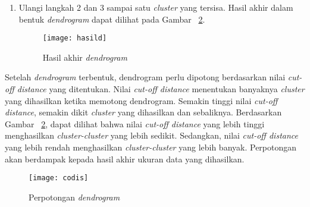 \begin{enumerate}
\begin{align} 
d(A,C) & = \sqrt{(2 - 2)^2+(4 - 6)^2} \\
& = 4.47 
\end{align}
\begin{align} 
d(B,C) & = \sqrt{(2 - 3)^2+(4 - 6)^2} \\
& = 3.61 
\end{align}\\


Karena nilai 3.61 lebih kecil dari 4.47, maka nilai 3.61 diambil sebagai hasil. Contoh hasil dapat dilihat pada Gambar ~\ref{fig:step3}. 

\begin{figure}[H]
    \centering  
    \texttt{[image: step3]}  
    \caption[Hasil rekalkulasi]{Hasil rekalkulasi} 
    \label{fig:step3} 
\end{figure}

\item Ulangi langkah 2 dan 3 sampai satu \textit{cluster} yang tersisa. Hasil akhir dalam bentuk \textit{dendrogram} dapat dilihat pada Gambar ~\ref{fig:hasild}.

\begin{figure}[H]
    \centering  
    \texttt{[image: hasild]}  
    \caption[Hasil akhir \textit{dendrogram} ]{Hasil akhir \textit{dendrogram}} 
    \label{fig:hasild} 
\end{figure}

\end{enumerate}

Setelah \textit{dendrogram} terbentuk, dendrogram perlu dipotong berdasarkan nilai \textit{cut-off distance} yang ditentukan. Nilai \textit{cut-off distance} menentukan banyaknya \textit{cluster} yang dihasilkan ketika memotong dendrogram. Semakin tinggi nilai \textit{cut-off distance}, semakin dikit \textit{cluster} yang dihasilkan dan sebaliknya. Berdasarkan Gambar ~\ref{fig:hasild}, dapat dilihat bahwa nilai \textit{cut-off distance} yang lebih tinggi menghasilkan \textit{cluster-cluster} yang lebih sedikit. Sedangkan, nilai \textit{cut-off distance} yang lebih rendah menghasilkan \textit{cluster-cluster} yang lebih banyak. Perpotongan akan berdampak kepada hasil akhir ukuran data yang dihasilkan. 

\begin{figure}[H]
    \centering  
    \texttt{[image: codis]}  
    \caption[Perpotongan \textit{dendrogram} ]{Perpotongan \textit{dendrogram}} 
    \label{fig:codis} 
\end{figure}

